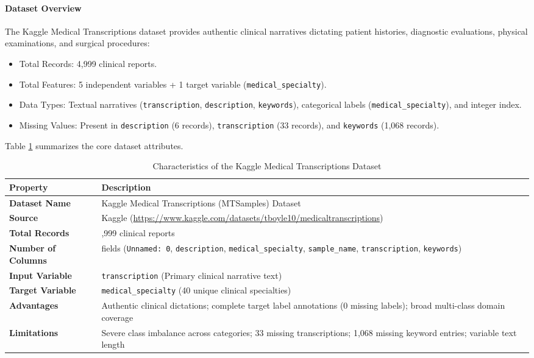 \paragraph{Dataset Overview}
The Kaggle Medical Transcriptions dataset provides authentic clinical narratives dictating patient histories, diagnostic evaluations, physical examinations, and surgical procedures:
\begin{itemize}
    \item Total Records: 4,999 clinical reports.
    \item Total Features: 5 independent variables + 1 target variable (\texttt{medical\_specialty}).
    \item Data Types: Textual narratives (\texttt{transcription}, \texttt{description}, \texttt{keywords}), categorical labels (\texttt{medical\_specialty}), and integer index.
    \item Missing Values: Present in \texttt{description} (6 records), \texttt{transcription} (33 records), and \texttt{keywords} (1,068 records).
\end{itemize}

Table \ref{tab:dataset_summary_card} summarizes the core dataset attributes.

\begin{table}[H]
\centering
\small
\setlength{\tabcolsep}{5pt}
\begin{tabularx}{\linewidth}{|>{\raggedright\arraybackslash}p{3.8cm}|>{\raggedright\arraybackslash}X|}
\hline
\textbf{Property} & \textbf{Description} \\
\hline
\textbf{Dataset Name} & Kaggle Medical Transcriptions (MTSamples) Dataset \\
\hline
\textbf{Source} & Kaggle (\url{https://www.kaggle.com/datasets/tboyle10/medicaltranscriptions}) \\
\hline
\textbf{Total Records} & 4,999 clinical reports \\
\hline
\textbf{Number of Columns} & 6 fields (\texttt{Unnamed: 0}, \texttt{description}, \texttt{medical\_specialty}, \texttt{sample\_name}, \texttt{transcription}, \texttt{keywords}) \\
\hline
\textbf{Input Variable} & \texttt{transcription} (Primary clinical narrative text) \\
\hline
\textbf{Target Variable} & \texttt{medical\_specialty} (40 unique clinical specialties) \\
\hline
\textbf{Advantages} & Authentic clinical dictations; complete target label annotations (0 missing labels); broad multi-class domain coverage \\
\hline
\textbf{Limitations} & Severe class imbalance across categories; 33 missing transcriptions; 1,068 missing keyword entries; variable text length \\
\hline
\end{tabularx}
\caption{Characteristics of the Kaggle Medical Transcriptions Dataset}
\label{tab:dataset_summary_card}
\end{table}

